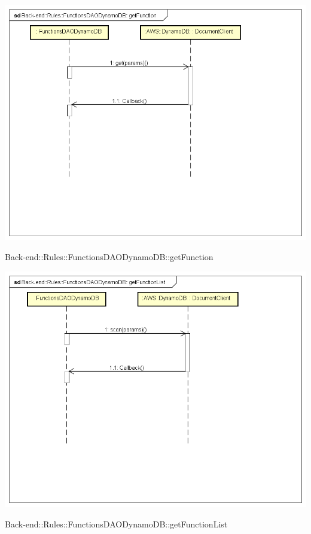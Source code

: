 \includegraphics[width=\textwidth,height=\textheight,keepaspectratio]{images/diagrams/back-end/Ufficial_Backend/Back-end__Rules__FunctionsDAODynamoDB__getFunction.png} 	\caption{Back-end::Rules::FunctionsDAODynamoDB::getFunction}
\includegraphics[width=\textwidth,height=\textheight,keepaspectratio]{images/diagrams/back-end/Ufficial_Backend/Back-end__Rules__FunctionsDAODynamoDB__getFunctionList.png} 	\caption{Back-end::Rules::FunctionsDAODynamoDB::getFunctionList}
